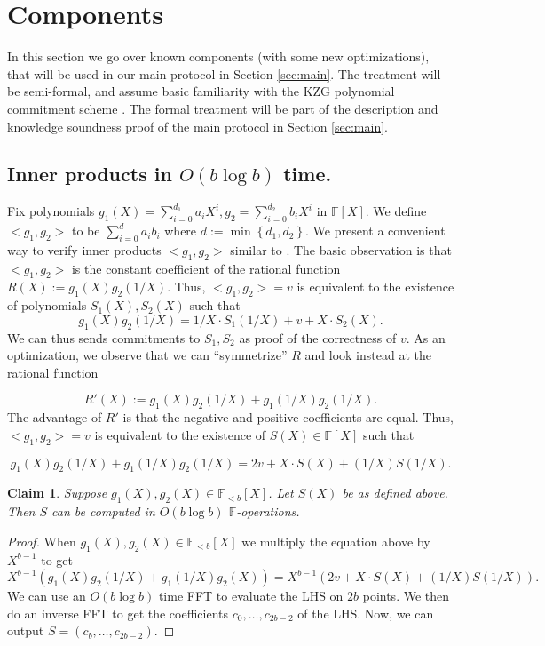 \documentclass[11pt]{article} %
\newcommand{\F}{\ensuremath{\mathbb F}\xspace}
\newcommand{\defeq}{:=}
\newcommand{\set}[1]{\ensuremath{\left\{#1\right\}}\xspace}
\newcommand{\polysofdeg}[1]{\ensuremath{\F_{< #1}[X]}\xspace}
\newcommand{\polys}{\ensuremath{\F[X]}\xspace}
\newtheorem{claim}[lemma]{Claim}
\begin{document}
\section{Components}\label{sec:components}
In this section we go over known components (with some new optimizations), that will be used in our main protocol in Section \ref{sec:main}. The treatment will  be  semi-formal, and assume basic familiarity with the KZG polynomial commitment scheme \cite{kzg}. The formal treatment will be part of the description and knowledge soundness proof of the main protocol in Section \ref{sec:main}.
\subsection{Inner products in $O(b\log b)$ time.}
Fix polynomials $g_1(X)=\sum_{i=0}^{d_1} a_i X^i,g_2=\sum_{i=0}^{d_2} b_i X^i$ in $\polys$.
We define $<g_1,g_2>$ to be $\sum_{i=0}^d a_i b_i$ where $d\defeq \min \set{d_1,d_2}$. 
We present a convenient way to verify inner products $<g_1,g_2>$ similar to \cite{bootle,sonic}.
The basic observation is that  $<g_1,g_2>$ is the constant coefficient of the rational function
$R(X)\defeq g_1(X) g_2(1/X)$.
Thus, $<g_1,g_2>=v$ is equivalent to the existence of polynomials $S_1(X),S_2(X)$ such that
\[g_1(X) g_2(1/X)=1/X\cdot S_1(1/X) + v + X\cdot S_2(X).\] 
We can thus sends commitments to $S_1,S_2$ as proof of the correctness of $v$.
As an optimization, we observe that we can ``symmetrize'' $R$ and look instead at the rational function

\[R'(X)\defeq g_1(X) g_2(1/X)+g_1(1/X) g_2(1/X).\]
The advantage of $R'$ is that the negative and positive coefficients are equal. Thus,
$<g_1,g_2>=v$ is equivalent to the existence of $S(X)\in \polys$ such that

\[ g_1(X) g_2(1/X)+g_1(1/X) g_2(1/X)=2v + X\cdot S(X) + (1/X)S(1/X).\]

\begin{claim}\label{clm:computeS}
 Suppose $g_1(X),g_2(X)\in \polysofdeg{b}$. Let $S(X)$ be as defined above.
 Then $S$ can be computed in $O(b \log b)$ \F-operations.
\end{claim}
\begin{proof}
When $g_1(X),g_2(X)\in \polysofdeg{b}$ we multiply the equation above by $X^{b-1}$ to get
\[ X^{b-1}(g_1(X) g_2(1/X)+g_1(1/X) g_2(X))=X^{b-1}(2v + X\cdot S(X) + (1/X)S(1/X)).\]
We can use an $O(b \log b )$ time FFT to evaluate the LHS on $2b$ points. We then do an inverse
FFT to get the coefficients $c_0,\ldots,c_{2b-2}$ of the LHS. Now, we can output $S=(c_b,\ldots, c_{2b-2})$.
\end{proof}
\end{document}
